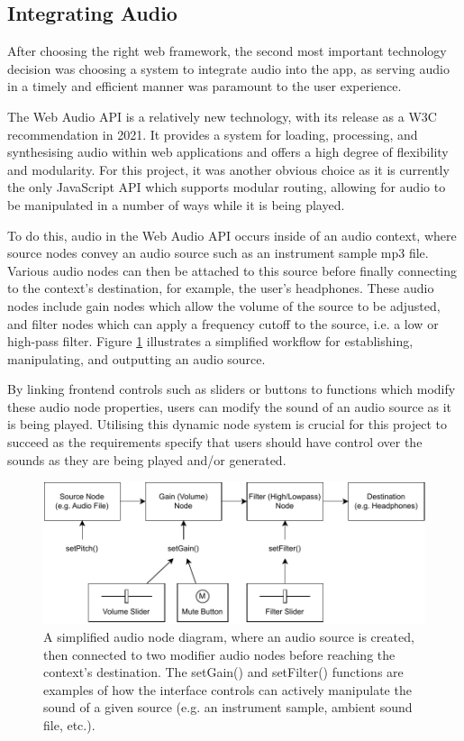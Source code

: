 \subsection{Integrating Audio}
After choosing the right web framework, the second most important technology decision was choosing a system to integrate audio into the app, as serving audio in a timely and efficient manner was paramount to the user experience.

The Web Audio API is a relatively new technology, with its release as a W3C recommendation in 2021. It provides a system for loading, processing, and synthesising audio within web applications and offers a high degree of flexibility and modularity. For this project, it was another obvious choice as it is currently the only JavaScript API which supports modular routing, allowing for audio to be manipulated in a number of ways while it is being played.

To do this, audio in the Web Audio API occurs inside of an audio context, where source nodes convey an audio source such as an instrument sample mp3 file. Various audio nodes can then be attached to this source before finally connecting to the context’s destination, for example, the user’s headphones. These audio nodes include gain nodes which allow the volume of the source to be adjusted, and filter nodes which can apply a frequency cutoff to the source, i.e. a low or high-pass filter. Figure \ref{fig:web-audio-api} illustrates a simplified workflow for establishing, manipulating, and outputting an audio source.

By linking frontend controls such as sliders or buttons to functions which modify these audio node properties, users can modify the sound of an audio source as it is being played. Utilising this dynamic node system is crucial for this project to succeed as the requirements specify that users should have control over the sounds as they are being played and/or generated.

\begin{figure}[htb]
    \centering
    \includegraphics[width=0.7\linewidth]{images/implementation/web-audio-api.pdf}    
    \caption{A simplified audio node diagram, where an audio source is created, then connected to two modifier audio nodes before reaching the context's destination. The setGain() and setFilter() functions are examples of how the interface controls can actively manipulate the sound of a given source (e.g. an instrument sample, ambient sound file, etc.).}
    \label{fig:web-audio-api}
\end{figure}

